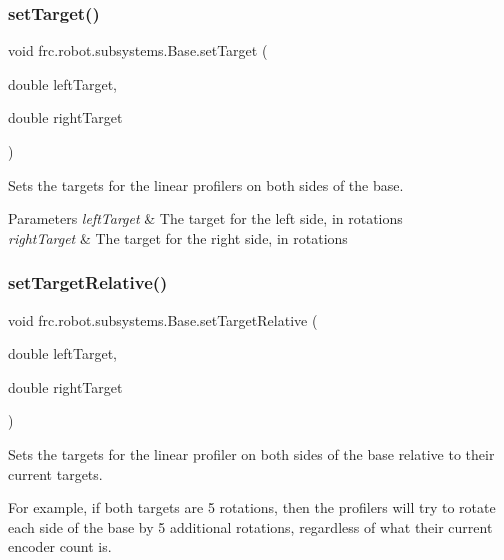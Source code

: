 \subsubsection{\texorpdfstring{setTarget()}{setTarget()}}
{\footnotesize\ttfamily void frc.\+robot.\+subsystems.\+Base.\+set\+Target (\begin{DoxyParamCaption}\item[{double}]{left\+Target,  }\item[{double}]{right\+Target }\end{DoxyParamCaption})\hspace{0.3cm}{\ttfamily [inline]}}



Sets the targets for the linear profilers on both sides of the base. 


\begin{DoxyParams}{Parameters}
{\em left\+Target} & The target for the left side, in rotations \\
\hline
{\em right\+Target} & The target for the right side, in rotations \\
\hline
\end{DoxyParams}
\mbox{\label{classfrc_1_1robot_1_1subsystems_1_1_base_af59a0fae3d6c2c4150406fb02288d1a3}} 
\subsubsection{\texorpdfstring{setTargetRelative()}{setTargetRelative()}}
{\footnotesize\ttfamily void frc.\+robot.\+subsystems.\+Base.\+set\+Target\+Relative (\begin{DoxyParamCaption}\item[{double}]{left\+Target,  }\item[{double}]{right\+Target }\end{DoxyParamCaption})\hspace{0.3cm}{\ttfamily [inline]}}



Sets the targets for the linear profiler on both sides of the base relative to their current targets. 

For example, if both targets are 5 rotations, then the profilers will try to rotate each side of the base by 5 additional rotations, regardless of what their current encoder count is.


